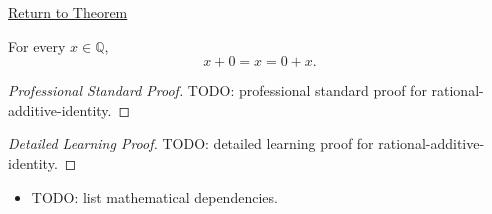 \newpage
{}
\label{prf:rational-additive-identity}

\begin{remark*}[Return]
\hyperref[thm:rational-additive-identity]{Return to Theorem}
\end{remark*}

\begin{theorem*}
For every $x\in\mathbb{Q}$,
\[
x+0=x=0+x.
\]
\end{theorem*}

\begin{proof}[Professional Standard Proof]
\LRAProofBodyStart
TODO: professional standard proof for rational-additive-identity.
\end{proof}

\begin{proof}[Detailed Learning Proof]
\LRAProofBodyStart
TODO: detailed learning proof for rational-additive-identity.
\end{proof}

\begin{remark*}
\end{remark*}

\begin{dependencies}
\begin{itemize}
  \item TODO: list mathematical dependencies.
\end{itemize}
\end{dependencies}

\clearpage
